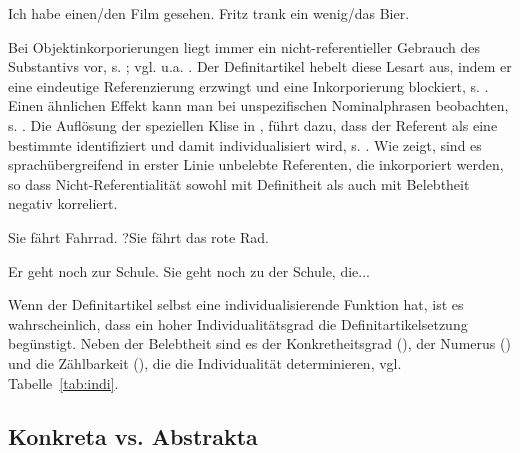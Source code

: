 \begin{exe}
	\ex \label{ex:Referentialität} Ich habe einen/den Film gesehen.
	\ex \label{ex:bier} Fritz trank ein wenig/das Bier.
\end{exe} 
\noindent
Bei Objektinkorporierungen liegt immer ein nicht-referentieller Gebrauch des Substantivs vor, s. ; vgl. u.a. \textcite{Mithun1984}. Der Definitartikel hebelt diese Lesart aus, indem er eine eindeutige Referenzierung erzwingt und eine Inkorporierung blockiert, s. .  Einen ähnlichen Effekt kann man bei unspezifischen Nominalphrasen beobachten, s. . Die Auflösung der speziellen Klise in , führt dazu, dass der Referent als eine bestimmte  identifiziert und damit individualisiert wird, s. . Wie \textcite[169]{Croft2006} zeigt, sind es sprachübergreifend in erster Linie unbelebte Referenten, die inkorporiert werden, so dass Nicht-Referentialität sowohl mit Definitheit als auch mit Belebtheit negativ korreliert.

\begin{exe}
	\ex \label{ex:inkorp}
	\begin{xlist}
		\ex \label{ex:rad} Sie fährt Fahrrad.
		\ex \label{ex:dasrad} ?Sie fährt das rote Rad.
	\end{xlist}
	\ex \label{ex:unspez}
	\begin{xlist}
		\ex \label{ex:schule} Er geht noch zur Schule.
		\ex \label{ex:dieschule} Sie geht noch zu der Schule, die...
	\end{xlist}
\end{exe} 

\noindent
Wenn der Definitartikel selbst eine individualisierende Funktion hat, ist es wahrscheinlich, dass ein hoher Individualitätsgrad die Definitartikelsetzung begünstigt. Neben der Belebtheit sind es der Konkretheitsgrad (), der Numerus () und die Zählbarkeit (), die 
die Individualität determinieren, vgl. Tabelle~\ref{tab:indi}.

\subsection{Konkreta vs. Abstrakta}\label{sec:konabst}

